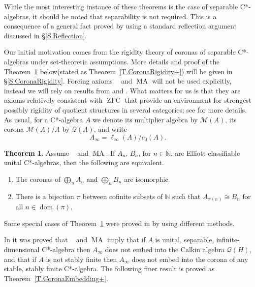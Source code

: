 \documentclass[11pt]{amsproc}
\newcommand{\bbN}{\mathbb N}
\newcommand{\cstar}{C*}
\newcommand{\cM}{\mathcal M}
\newcommand{\cQ}{\mathcal Q}
\DeclareMathOperator{\dom}{dom}
\DeclareMathOperator{\OCAT}{OCA_T}
\DeclareMathOperator{\MA}{MA}
\DeclareMathOperator{\ZFC}{ZFC}
\theoremstyle{definition}
\newtheorem{thm}{Theorem}
\theoremstyle{plain}
\theoremstyle{remark}
\begin{document}
While the most interesting instance of these theorems is the case of separable \cstar-algebras, it should be noted that separability is not required. This is a consequence of a general fact proved by using a standard reflection argument discussed in \S\ref{S.Reflection}. 



Our initial motivation comes from the rigidity theory of coronas of separable \cstar-algebras under set-theoretic assumptions. 
More details and proof of the Theorem~\ref{T.CoronaRigidity} below(stated as Theorem~\ref{T.CoronaRigidity+}) will be given in \S\ref{S.CoronaRigidity}. Forcing axioms $\OCAT$ and $\MA$ will not be used explicitly, instead we will rely on results from \cite{mckenney2020forcing} and \cite{vignati2022rigidity}. What matters for us is that they are axioms relatively consistent with $\ZFC$ that provide an environment for strongest possibly rigidity of quotient structures in several categories; see \cite{farah2025corona} for more details.  As usual, for a \cstar-algebra $A$ we denote its multiplier algebra by $\cM(A)$, its corona $\cM(A)/A$ by $\cQ(A)$, and write
\[
A_\infty=\ell_\infty(A)/c_0(A). 
\] 


\begin{thm} \label{T.CoronaRigidity} Assume $\OCAT$ and $\MA$. 
	If $A_n$, $B_n$, for $n\in \bbN$, are Elliott-classifiable unital \cstar-algebras,  then the following are equivalent. 
	\begin{enumerate}
		\item The coronas of $\bigoplus_n A_n$ and $\bigoplus_n B_n$ are isomorphic. 
		\item There is a bijection $\pi$ between cofinite subsets of $\bbN$ such that $A_{\pi(n)}\cong B_n$ for all $n\in \dom(\pi)$. 
	\end{enumerate}
\end{thm}

Some special cases of Theorem~\ref{T.CoronaRigidity} were proved in \cite{vignati2022rigidity} by using different methods.  

\medskip

In \cite[Theorem~D]{vignati2022rigidity} it was proved that $\OCAT$ and $\MA$ imply that if $A$ is unital, separable, infinite-dimensional \cstar-algebra then  $A_\infty$ does not embed into the Calkin algebra $\cQ(H)$, and that if $A$ is not stably finite then $A_\infty$ does not embed into  the corona of any stable, stably finite \cstar-algebra. 
The following finer result is proved as Theorem~\ref{T.CoronaEmbedding+}. 
\end{document}
